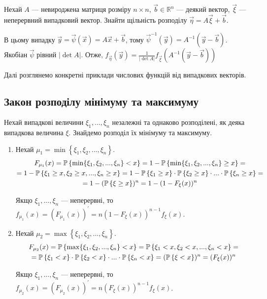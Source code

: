 \begin{example}
    Нехай $A$ --- невироджена матриця розміру $n \times n$, $\vec{b} \in \mathbb{R}^n$ --- деякий вектор, $\vec{\xi}$ --- неперервний випадковий вектор.
    Знайти щільність розподілу $\vec{\eta} = A \vec{\xi} + \vec{b}$.

    В цьому випадку $\vec{y} = \vec{\psi}(\vec{x}) = A \vec{x} + \vec{b}$, тому $\vec{\psi}^{-1} (\vec{y}) = A^{-1} (\vec{y} - \vec{b})$. Якобіан $\vec{\psi}$ рівний $\left| \det A\right|$. 
    Отже,
    $f_{\vec{\eta}}(\vec{y}) = \frac{1}{\left| \det A\right|} f_{\vec{\xi}}\left(A^{-1} (\vec{y} - \vec{b})\right)$
\end{example}

Далі розглянемо конкретні приклади числових функцій від випадкових векторів.

\subsection{Закон розподілу мінімуму та максимуму}

Нехай випадкові величини $\xi_1, ..., \xi_n$ незалежні та однаково розподілені, як деяка випадкова величина $\xi$.
Знайдемо розподіл їх мінімуму та максимуму.
\begin{enumerate}
    \item Нехай $\mu_1 = \min\left\{\xi_1, \xi_2, ..., \xi_n\right\}$.
    \begin{gather*}
        F_{\mu_1} (x) = \P \left\{ \min\{\xi_1, \xi_2, ..., \xi_n\} < x \right\} =
        1 - \P \left\{ \min\{\xi_1, \xi_2, ..., \xi_n\} \geq x \right\} = \\ =
        1 - \P \left\{ \xi_1 \geq x, \xi_2 \geq x, ..., \xi_n \geq x \right\} = 
        1 - \P\left\{ \xi_1 \geq x\right\} \cdot \P\left\{ \xi_2 \geq x\right\} \cdot ... \cdot \P\left\{ \xi_n \geq x\right\} = \\
        = 1 - (\P\left\{ \xi \geq x\right\})^n = 1 - (1- F_\xi (x))^n
    \end{gather*}

    Якщо $\xi_1, ..., \xi_n$ --- неперервні, то $f_{\mu_1} (x) = \left( F_{\mu_1} (x)\right)^\prime = n (1- F_\xi (x))^{n-1} f_\xi(x)$.
    \item Нехай $\mu_2 = \max\left\{\xi_1, \xi_2, ..., \xi_n\right\}$.
    \begin{gather*}
        F_{\mu_2} (x) = \P \left\{ \max\{\xi_1, \xi_2, ..., \xi_n\} < x \right\} =
        \P \left\{ \xi_1 < x, \xi_2 < x, ..., \xi_n < x \right\} = \\ =
        \P\left\{ \xi_1 < x\right\} \cdot \P\left\{ \xi_2 < x\right\} \cdot ... \cdot \P\left\{ \xi_n < x\right\} =
        (\P\left\{ \xi < x\right\})^n = (F_\xi (x))^n
    \end{gather*}

    Якщо $\xi_1, ..., \xi_n$ --- неперервні, то $f_{\mu_2} (x) = \left( F_{\mu_2} (x)\right)^\prime = n (F_\xi (x))^{n-1} f_\xi(x)$.
\end{enumerate}

